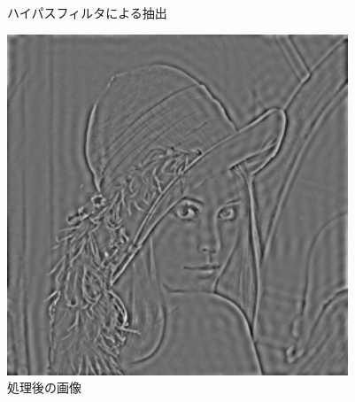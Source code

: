 \begin{figure}[h]
\begin{minipage}{.25\hsize}
    \caption{ハイパスフィルタによる抽出}
    \label{fig:high_pass_dft}
  \end{minipage}
  \begin{minipage}{.25\hsize}
    \includegraphics[clip, width=\textwidth]{figure/high_pass_idft_2d.pdf}
    \caption{処理後の画像}
    \label{fig:high_pass_idft}
  \end{minipage}
\end{figure}
\fi
